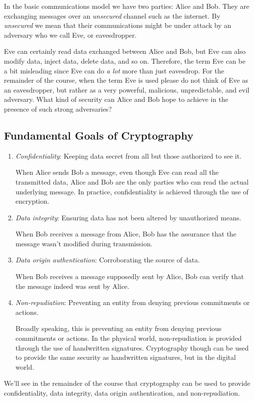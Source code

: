 In the basic communications model we have two parties: Alice and Bob. They
are exchanging messages over an \emph{unsecured} channel such as the internet.
By \emph{unsecured} we mean that their communications might be
under attack by an adversary who we call Eve, or eavesdropper.

Eve can certainly read data exchanged between Alice and Bob, but Eve
can also modify data, inject data,
delete data, and so on. Therefore, the term Eve can be a bit misleading since Eve
can do \emph{a lot} more than just eavesdrop. For
the remainder of the course,
when the term Eve is used please do not think of Eve
as an eavesdropper, but rather as a very powerful, malicious, unpredictable,
and evil adversary. What kind of security can Alice and Bob hope
to achieve in the presence of such strong adversaries?

\subsection*{Fundamental Goals of Cryptography}
\begin{enumerate}
    \item \emph{Confidentiality}: Keeping data secret from all but those
          authorized to see it.

              {\color{blue} When Alice
                  sends Bob a message, even though
                  Eve can read all the transmitted data, Alice
                  and Bob are the only parties
                  who can read the actual underlying message.
                  In practice, confidentiality
                  is achieved through the use of encryption.}
    \item \emph{Data integrity}: Ensuring data has not been altered by unauthorized
          means.

              {\color{blue} When Bob receives a message from Alice, Bob has
                  the assurance that the message wasn't modified during transmission.}
    \item \emph{Data origin authentication}: Corroborating the source of data.

              {\color{blue}
                  When Bob receives a message supposedly sent by Alice, Bob can verify that
                  the message indeed was sent by Alice.}
    \item \emph{Non-repudiation}: Preventing an entity from denying previous commitments or
          actions.

              {\color{blue} Broadly speaking, this
                  is preventing an entity from
                  denying previous commitments or actions. In
                  the physical world,
                  non-repudiation is provided through the use
                  of handwritten signatures. Cryptography though can be used to provide
                  the same security as handwritten signatures, but in the digital world.}
\end{enumerate}
We'll see in the remainder of the course that cryptography can be used to provide
confidentiality, data integrity, data origin authentication, and non-repudiation.

